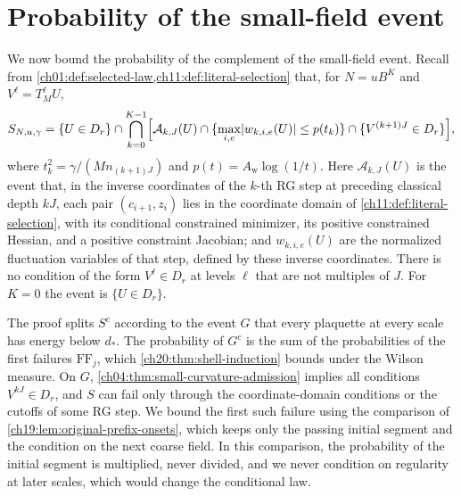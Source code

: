 \section{Probability of the small-field event}\label{ch20:sec:small-field}

We now bound the probability of the complement of the small-field event. Recall from \cref{ch01:def:selected-law,ch11:def:literal-selection} that, for $N=uB^K$ and $V^\ell=T_M^\ell U$,
\[
 S_{N,u,\gamma}=\{U\in D_r\}\cap\bigcap_{k=0}^{K-1}\Bigl[\mathcal A_{k,J}(U)\cap\{\max_{i,e}\lvert w_{k,i,e}(U)\rvert\le p(t_k)\}\cap\{V^{(k+1)J}\in D_r\}\Bigr],
\]
where $t_k^2=\gamma/(Mn_{(k+1)J})$ and $p(t)=A_{\mathrm w}\log(1/t)$. Here $\mathcal A_{k,J}(U)$ is the event that, in the inverse coordinates of the $k$-th RG step at preceding classical depth $kJ$, each pair $(c_{i+1},z_i)$ lies in the coordinate domain of \cref{ch11:def:literal-selection}, with its conditional constrained minimizer, its positive constrained Hessian, and a positive constraint Jacobian; and $w_{k,i,e}(U)$ are the normalized fluctuation variables of that step, defined by these inverse coordinates. There is no condition of the form $V^\ell\in D_r$ at levels $\ell$ that are not multiples of $J$. For $K=0$ the event is $\{U\in D_r\}$.

The proof splits $S^c$ according to the event $G$ that every plaquette at every scale has energy below $d_*$. The probability of $G^c$ is the sum of the probabilities of the first failures $\mathrm{FF}_j$, which \cref{ch20:thm:shell-induction} bounds under the Wilson measure. On $G$, \cref{ch04:thm:small-curvature-admission} implies all conditions $V^{kJ}\in D_r$, and $S$ can fail only through the coordinate-domain conditions or the cutoffs of some RG step. We bound the first such failure using the comparison of \cref{ch19:lem:original-prefix-onsets}, which keeps only the passing initial segment and the condition on the next coarse field. In this comparison, the probability of the initial segment is multiplied, never divided, and we never condition on regularity at later scales, which would change the conditional law.

